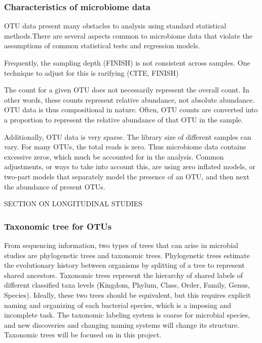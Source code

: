 \documentclass[12pt]{article}
\begin{document}
\subsubsection{Characteristics of microbiome data}

OTU data present many obstacles to analysis using standard statistical methods.There are several aspects common to microbiome data that violate the assumptions of common statistical tests and regression models.

Frequently, the sampling depth (FINISH) is not consistent across samples. One technique to adjust for this is rarifying (CITE, FINISH)

The count for a given OTU does not necessarily represent the overall count. In other words, these counts represent relative abundance, not absolute abundance. OTU data is thus compositional in nature. Often, OTU counts are converted into a proportion to represent the relative abundance of that OTU in the sample.

Additionally, OTU data is very sparse. The library size of different samples can vary. For many OTUs, the total reads is zero. Thus microbiome data contains excessive zeros, which much be accounted for in the analysis. Common adjustments, or ways to take into account this, are using zero inflated models, or two-part models that separately model the presence of an OTU, and then next the abundance of present OTUs.


SECTION ON LONGITUDINAL STUDIES


\subsubsection{Taxonomic tree for OTUs}

From sequencing information, two types of trees that can arise in microbial studies are phylogenetic trees and taxonomic trees. Phylogenetic trees estimate the evolutionary history between organisms by splitting of a tree to represent shared ancestors. Taxonomic trees represent the hierarchy of shared labels of different classified taxa levels (Kingdom, Phylum, Class, Order, Family, Genus, Species). Ideally, these two trees should be equivalent, but this requires explicit naming and organizing of each bacterial species, which is a imposing and incomplete task. The taxonomic labeling system is coarse for microbial species, and new discoveries and changing naming systems will change its structure. Taxonomic trees will be focused on in this project.
\end{document}
